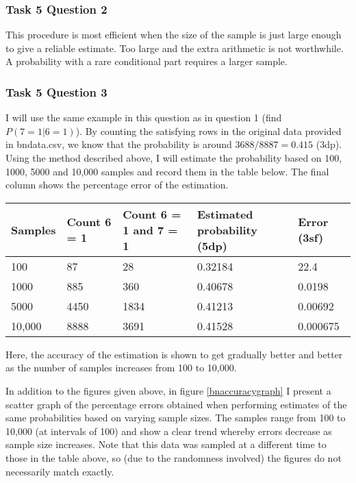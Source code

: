 \documentclass[a4paper,11pt]{article}
\begin{document}
\subsubsection{Task 5 Question 2}

This procedure is most efficient when the size of the sample is just large enough to give a reliable estimate.  Too large and the extra arithmetic is not worthwhile.  A probability with a rare conditional part requires a larger sample.

\subsubsection{Task 5 Question 3}

I will use the same example in this question as in question 1 (find $P(7=1|6=1)$).  By counting the satisfying rows in the original data provided in bndata.csv, we know that the probability is around $3688 / 8887 = 0.415$ (3dp).  Using the method described above, I will estimate the probability based on 100, 1000, 5000 and 10,000 samples and record them in the table below.  The final column shows the percentage error of the estimation.

\begin{tabular}{l l l l l}
	Samples		& Count 6 = 1	& Count 6 = 1 and 7 = 1	& Estimated probability (5dp)		& Error (3sf) \\
	\hline
	100		& 87	& 28	& 0.32184		& 22.4 \\
	1000	& 885	& 360	& 0.40678		& 0.0198 \\
	5000	& 4450	& 1834	& 0.41213		& 0.00692 \\
	10,000	& 8888	& 3691	& 0.41528		& 0.000675
\end{tabular}

Here, the accuracy of the estimation is shown to get gradually better and better as the number of samples increases from 100 to 10,000.

In addition to the figures given above, in figure \ref{bnaccuracygraph} I present a scatter graph of the percentage errors obtained when performing estimates of the same probabilities based on varying sample sizes.  The samples range from 100 to 10,000 (at intervals of 100) and show a clear trend whereby errors decrease as sample size increases.  Note that this data was sampled at a different time to those in the table above, so (due to the randomness involved) the figures do not necessarily match exactly.
\end{document}
